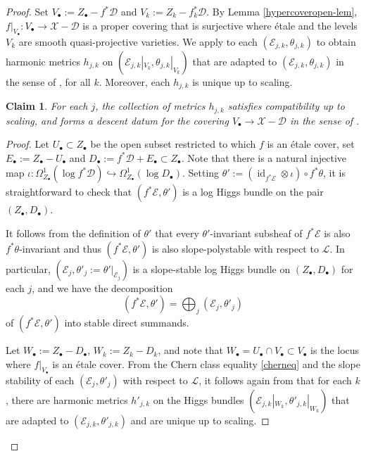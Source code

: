 \documentclass[a4paper]{amsart}
\newtheorem{claim}[theorem]{Claim}
\theoremstyle{definition}
\def\id{\mathop{\mathrm{id}}\nolimits}
\begin{document}
\begin{proof}
Set $V_\bullet:=Z_\bullet-f^*\mathscr{D}$ and $V_k:=Z_k-f_k^*\mathscr{D}$. By Lemma \ref{hypercoveropen-lem}, $f|_{V_\bullet}:V_\bullet\to\mathscr{X}-\mathscr{D}$ is a proper covering that is surjective where \'etale and the levels $V_k$ are smooth quasi-projective varieties. We apply \cite[Theorem 9.4]{mochizuki_asterisque} to each $(\mathcal{E}_{j,k},\theta_{j,k})$ to obtain harmonic metrics $h_{j,k}$ on $(\mathcal{E}_{j,k}|_{V_k},\theta_{j,k}|_{V_k})$ that are adapted to $(\mathcal{E}_{j,k},\theta_{j,k})$ in the sense of \cite[Definition 2.7]{dengcadorel}, for all $k$. Moreover, each $h_{j,k}$ is unique up to scaling. 
\begin{claim}\label{claim-descent}
For each $j$, the collection of metrics $h_{j,k}$ satisfies compatibility up to scaling, and forms a descent datum for the covering $V_\bullet\to\mathscr{X}-\mathscr{D}$ in the sense of \cite[Section 5]{simpsonstacks}. 
\end{claim}
\begin{proof}
Let $U_\bullet\subset Z_\bullet$ be the open subset restricted to which $f$ is an \'etale cover, set $E_\bullet:=Z_\bullet-U_\bullet$ and $D_\bullet:=f^*\mathscr{D}+E_\bullet\subset Z_\bullet$. Note that there is a natural injective map $\iota:\Omega^1_{Z_\bullet}(\log f^*\mathscr{D})\hookrightarrow\Omega^1_{Z_\bullet}(\log D_\bullet)$. Setting $\theta':=(\id_{f^*\mathcal{E}}\otimes\iota)\circ f^*\theta$, it is straightforward to check that $(f^*\mathcal{E},\theta')$ is a log Higgs bundle on the pair $(Z_\bullet,D_\bullet)$.

It follows from the definition of $\theta'$ that every $\theta'$-invariant subsheaf of $f^*\mathcal{E}$ is also $f^*\theta$-invariant and thus $(f^*\mathcal{E},\theta')$ is also slope-polystable with respect to $\mathcal{L}$. In particular, $(\mathcal{E}_j,\theta'_j:=\theta'|_{\mathcal{E}_j})$ is a slope-stable log Higgs bundle on $(Z_\bullet,D_\bullet)$ for each $j$, and we have the decomposition 
\[
(f^*\mathcal{E},\theta')=\bigoplus_j(\mathcal{E}_j,\theta'_j)
\]
of $(f^*\mathcal{E},\theta')$ into stable direct summands. 

Let $W_\bullet:=Z_\bullet-D_\bullet$, $W_k:=Z_k-D_k$, and note that $W_\bullet=U_\bullet\cap V_\bullet\subset V_\bullet$ is the locus where $f|_{V_\bullet}$ is an \'etale cover. From the Chern class equality \ref{cherneq} and the slope stability of each $(\mathcal{E}_j,\theta'_j)$ with respect to $\mathcal{L}$, it follows again from \cite[Theorem 9.4]{mochizuki_asterisque} that for each $k$, there are harmonic metrics $h'_{j,k}$ on the Higgs bundles $(\mathcal{E}_{j,k}|_{W_k},\theta'_{j,k}|_{W_k})$ that are adapted to $(\mathcal{E}_{j,k},\theta'_{j,k})$ and are unique up to scaling.


\end{proof}
\end{proof}
\end{document}
